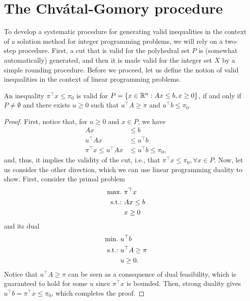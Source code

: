 \section{The Chv\'atal-Gomory procedure}

To develop a systematic procedure for generating valid inequalities in the context of a solution method for integer programming problems, we will rely on a two-step procedure. First, a cut that is valid for the polyhedral set $P$ is (somewhat automatically) generated, and then it is made valid for the integer set $X$ by a simple rounding procedure. Before we proceed, let us define the notion of valid inequalities in the context of linear programming problems.

\begin{proposition} \label{p1c10:prop:valid_inequality_LP}
	An inequality $\pi^\top x \leq \pi_0$ is valid for $P = \left\{ x \in \mathbb{R}^n : Ax \leq b, x \geq 0 \right \}$, if and only if $P \neq \emptyset$ and there exists $u \geq 0$ such that $u^\top A \geq \pi$ and $u^\top b \leq \pi_0$.
\end{proposition}

\begin{proof}
	First, notice that, for $u \ge 0$ and $x \in P$, we have 
	\begin{align*}
		Ax & \le b \\
		u^\top Ax & \le u^\top b \\
		\pi ^\top x \le u^\top Ax & \le u^\top b \le \pi_0,
	\end{align*}
	and, thus, it implies the validity of the cut, i.e., that $\pi^\top x \leq \pi_0, \forall x \in P$. Now, let us consider the other direction, which we can use linear programming duality to show. First, consider the primal problem
	\begin{align*}
		\mathop{\text{max.~}} & \pi ^\top x \\
		\mathop{\text{s.t.:~}}   & Ax \leq b \\
		      & x \geq 0
	\end{align*}
	and its dual 
	\begin{align*}
		\mathop{\text{min.~}} & u^\top b \\
		\mathop{\text{s.t.:~}}   & u^\top A \geq \pi \\
		      & u \geq 0. 
	\end{align*}
	Notice that $u^\top A\geq \pi$ can be seen as a consequence of dual feasibility, which is guaranteed to hold for some $u$ since $\pi^\top x$ is bounded. Then, strong duality gives $u^\top b = \pi ^\top x \leq \pi_0$, which completes the proof. 
\end{proof}


